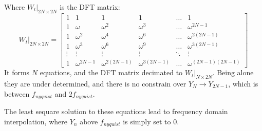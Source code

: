 \documentclass[12pt]{article}
\begin{document}
Where $W_t|_{2N \times 2N}$ is the DFT matrix:
\begin{equation}
W_t|_{2N \times 2N} =
 \begin{bmatrix}
        1 & 1 & 1 & 1 & \ldots & 1 \\
        1 & \omega & \omega^2 & \omega^3 & \ldots & \omega^{2N-1} \\
        1 & \omega^2 & \omega^4 & \omega^6 & \ldots & \omega^{2(2N-1)} \\
        1 & \omega^3 & \omega^6 & \omega^9 & \ldots & \omega^{3(2N-1)} \\
        \vdots & \vdots & \vdots & \vdots & \ddots & \vdots \\
        1 & \omega^{2N-1} & \omega^{2(2N-1)} & \omega^{3(2N-1)} & \ldots & \omega^{(2N-1)(2N-1)} 
    \end{bmatrix}
\end{equation}
It forms $N$ equations, and the DFT matrix decimated to $W_t|_{N\times 2N}$. 
Being alone they are under determined, 
and there is no constrain over $Y_N \to Y_{2N-1}$, 
which is between $f_{nyquist}$ and $2f_{nyquist}$. 


The least sequare solution to these equations lead to frequency domain interpolation, 
where $Y_n$ above $f_{nyquist}$ is simply set to $0$.
\end{document}
